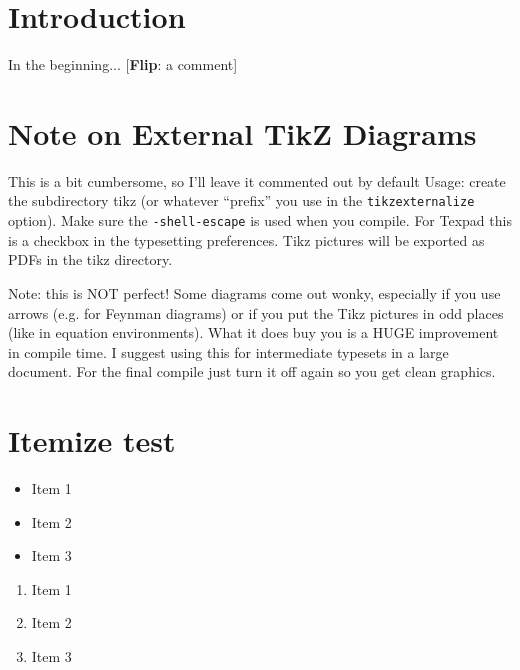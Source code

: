 \documentclass[12pt]{article}
\numberwithin{equation}{section}    %
\newcommand{\flip}[1]{{
	\color{green!50!black} \footnotesize [\textbf{\textsf{Flip}}: \textsf{#1}]
	}}
\begin{document}



\section{Introduction}

In the beginning... \flip{a comment}


\section{Note on External TikZ Diagrams}

 This is a bit cumbersome, so I'll leave it commented out by default
 Usage: create the subdirectory tikz (or whatever ``prefix'' you use in
 the \texttt{tikzexternalize} option). Make sure the \texttt{-shell-escape} 
 is used when you compile. 
 For Texpad this is a checkbox in the typesetting preferences.
 Tikz pictures will be exported as PDFs in the tikz directory.

 Note: this is NOT perfect! Some diagrams come out wonky, especially if you
 use arrows (e.g. for Feynman diagrams) or if you put the Tikz pictures in
 odd places (like in equation environments). What it does buy you is a HUGE
 improvement in compile time. I suggest using this for intermediate 
 typesets in a large document. For the final compile just turn it off again
 so you get clean graphics.
 
\section{Itemize test}

\begin{itemize}%
\item Item 1
\item Item 2
\item Item 3
\end{itemize}

\begin{enumerate}%
\item Item 1
\item Item 2
\item Item 3
\end{enumerate}
\end{document}
